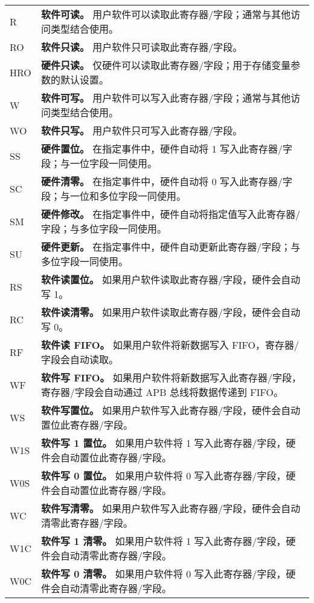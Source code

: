 \begin{longtable}[c]{ R{1cm} p{13cm} }

R & \textbf{软件可读。} 
	用户软件可以读取此寄存器/字段；通常与其他访问类型结合使用。 \\
RO & \textbf{软件只读。} 
	用户软件只可读取此寄存器/字段。 \\
HRO & \textbf{硬件只读。} 
	仅硬件可以读取此寄存器/字段；用于存储变量参数的默认设置。 \\
W & \textbf{软件可写。} 
	用户软件可以写入此寄存器/字段；通常与其他访问类型结合使用。 \\
WO & \textbf{软件只写。} 
	用户软件只可写入此寄存器/字段。 \\

SS & \textbf{硬件置位。} 
	在指定事件中，硬件自动将 1 写入此寄存器/字段；与一位字段一同使用。 \\
SC & \textbf{硬件清零。} 
	在指定事件中，硬件自动将 0 写入此寄存器/字段；与一位和多位字段一同使用。 \\
SM & \textbf{硬件修改。} 
	在指定事件中，硬件自动将指定值写入此寄存器/字段；与多位字段一同使用。 \\
SU & \textbf{硬件更新。} 
	在指定事件中，硬件自动更新此寄存器/字段；与多位字段一同使用。 \\

RS & \textbf{软件读置位。} 
	如果用户软件读取此寄存器/字段，硬件会自动写 1。 \\
RC & \textbf{软件读清零。} 
	如果用户软件读取此寄存器/字段，硬件会自动写 0。 \\
RF & \textbf{软件读 FIFO。} 
	如果用户软件将新数据写入 FIFO，寄存器/字段会自动读取。 \\

WF & \textbf{软件写 FIFO。} 
	如果用户软件将新数据写入此寄存器/字段，寄存器/字段会自动通过 APB 总线将数据传递到 FIFO。 \\

WS & \textbf{软件写置位。} 
	如果用户软件写入此寄存器/字段，硬件会自动置位此寄存器/字段。 \\
W1S & \textbf{软件写 1 置位。} 
	如果用户软件将 1 写入此寄存器/字段，硬件会自动置位此寄存器/字段。 \\
W0S & \textbf{软件写 0 置位。} 
	如果用户软件将 0 写入此寄存器/字段，硬件会自动置位此寄存器/字段。 \\

WC & \textbf{软件写清零。} 
	如果用户软件写入此寄存器/字段，硬件会自动清零此寄存器/字段。 \\
W1C & \textbf{软件写 1 清零。} 
	如果用户软件将 1 写入此寄存器/字段，硬件会自动清零此寄存器/字段。 \\
W0C & \textbf{软件写 0 清零。} 
	如果用户软件将 0 写入此寄存器/字段，硬件会自动清零此寄存器/字段。 \\


\end{longtable}
